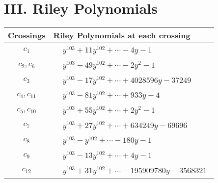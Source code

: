 \documentclass[1p]{elsarticle_modified}
\theoremstyle{definition}
\begin{document}
\centering \section*{ III. Riley Polynomials}
\begin{tabular}{m{50pt}|m{274pt}}
Crossings & \hspace{64pt}Riley Polynomials at each crossing \\
\hline $$\begin{aligned}c_{1}\end{aligned}$$&$\begin{aligned}
&y^{103}+11 y^{102}+\cdots-4 y-1
\end{aligned}$\\
\hline $$\begin{aligned}c_{2},c_{6}\end{aligned}$$&$\begin{aligned}
&y^{103}-49 y^{102}+\cdots-2 y^2-1
\end{aligned}$\\
\hline $$\begin{aligned}c_{3}\end{aligned}$$&$\begin{aligned}
&y^{103}-17 y^{102}+\cdots+4028596 y-37249
\end{aligned}$\\
\hline $$\begin{aligned}c_{4},c_{11}\end{aligned}$$&$\begin{aligned}
&y^{103}-81 y^{102}+\cdots+933 y-4
\end{aligned}$\\
\hline $$\begin{aligned}c_{5},c_{10}\end{aligned}$$&$\begin{aligned}
&y^{103}+55 y^{102}+\cdots+2 y^2-1
\end{aligned}$\\
\hline $$\begin{aligned}c_{7}\end{aligned}$$&$\begin{aligned}
&y^{103}+27 y^{102}+\cdots+634249 y-69696
\end{aligned}$\\
\hline $$\begin{aligned}c_{8}\end{aligned}$$&$\begin{aligned}
&y^{103}- y^{102}+\cdots-180 y-1
\end{aligned}$\\
\hline $$\begin{aligned}c_{9}\end{aligned}$$&$\begin{aligned}
&y^{103}-13 y^{102}+\cdots+4 y-1
\end{aligned}$\\
\hline $$\begin{aligned}c_{12}\end{aligned}$$&$\begin{aligned}
&y^{103}+31 y^{102}+\cdots-195909780 y-3568321
\end{aligned}$\\
\hline
\end{tabular}
\vskip 2pc
\end{document}

